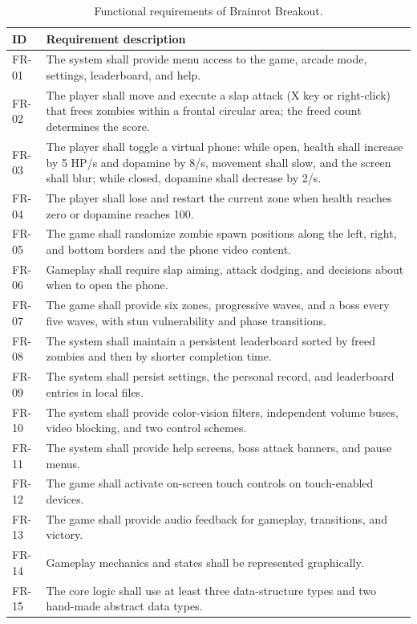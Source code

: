 \documentclass[conference]{IEEEtran}
\begin{document}
\begin{table}[t]
\caption{Functional requirements of Brainrot Breakout.}
\label{p1-tab:fr}
\centering
\small
\begin{tabularx}{\textwidth}{@{}lX@{}}
\toprule
\textbf{ID} & \textbf{Requirement description}\\
\midrule
FR-01 & The system shall provide menu access to the game, arcade mode, settings, leaderboard, and help.\\
FR-02 & The player shall move and execute a slap attack (X key or right-click) that frees zombies within a frontal circular area; the freed count determines the score.\\
FR-03 & The player shall toggle a virtual phone: while open, health shall increase by 5 HP/s and dopamine by 8/s, movement shall slow, and the screen shall blur; while closed, dopamine shall decrease by 2/s.\\
FR-04 & The player shall lose and restart the current zone when health reaches zero or dopamine reaches 100.\\
FR-05 & The game shall randomize zombie spawn positions along the left, right, and bottom borders and the phone video content.\\
FR-06 & Gameplay shall require slap aiming, attack dodging, and decisions about when to open the phone.\\
FR-07 & The game shall provide six zones, progressive waves, and a boss every five waves, with stun vulnerability and phase transitions.\\
FR-08 & The system shall maintain a persistent leaderboard sorted by freed zombies and then by shorter completion time.\\
FR-09 & The system shall persist settings, the personal record, and leaderboard entries in local files.\\
FR-10 & The system shall provide color-vision filters, independent volume buses, video blocking, and two control schemes.\\
FR-11 & The system shall provide help screens, boss attack banners, and pause menus.\\
FR-12 & The game shall activate on-screen touch controls on touch-enabled devices.\\
FR-13 & The game shall provide audio feedback for gameplay, transitions, and victory.\\
FR-14 & Gameplay mechanics and states shall be represented graphically.\\
FR-15 & The core logic shall use at least three data-structure types and two hand-made abstract data types.\\
\bottomrule
\end{tabularx}
\end{table}
\end{document}

